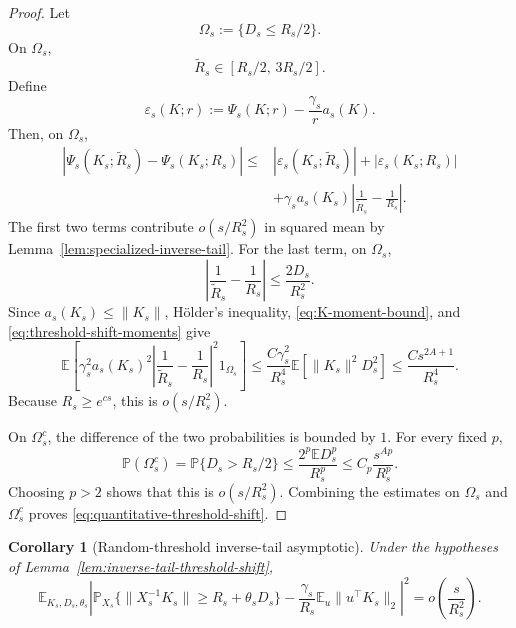 \documentclass[11pt]{article}
\newtheorem{corollary}{Corollary}
\newcommand{\Pbb}{\mathbb P}
\newcommand{\Ebb}{\mathbb E}
\newcommand{\1}{\mathbf 1}
\begin{document}
\begin{proof}
Let
\[
        \Omega_s:=\{D_s\le R_s/2\}.
\]
On \(\Omega_s\),
\[
        \widetilde R_s\in[R_s/2,\,3R_s/2].
\]
Define
\[
        \varepsilon_s(K;r)
        :=
        \Psi_s(K;r)-\frac{\gamma_s}{r}a_s(K).
\]
Then, on \(\Omega_s\),
\begin{align*}
        \left|
        \Psi_s(K_s;\widetilde R_s)
        -
        \Psi_s(K_s;R_s)
        \right|
        \le{}&
        |\varepsilon_s(K_s;\widetilde R_s)|
        +
        |\varepsilon_s(K_s;R_s)|
\\
        &+
        \gamma_s a_s(K_s)
        \left|
        \frac{1}{\widetilde R_s}
        -
        \frac{1}{R_s}
        \right|.
\end{align*}
The first two terms contribute \(o(s/R_s^2)\) in squared mean by
Lemma~\ref{lem:specialized-inverse-tail}.  For the last term, on \(\Omega_s\),
\[
        \left|
        \frac{1}{\widetilde R_s}
        -
        \frac{1}{R_s}
        \right|
        \le
        \frac{2D_s}{R_s^2}.
\]
Since \(a_s(K_s)\le\|K_s\|\), Hölder's inequality,
\eqref{eq:K-moment-bound}, and \eqref{eq:threshold-shift-moments} give
\[
        \Ebb
        \left[
        \gamma_s^2a_s(K_s)^2
        \left|
        \frac{1}{\widetilde R_s}
        -
        \frac{1}{R_s}
        \right|^2
        1_{\Omega_s}
        \right]
        \le
        \frac{C\gamma_s^2}{R_s^4}
        \Ebb\!\left[\|K_s\|^2D_s^2\right]
        \le
        \frac{C s^{2A+1}}{R_s^4}.
\]
Because \(R_s\ge e^{cs}\), this is \(o(s/R_s^2)\).

On \(\Omega_s^c\), the difference of the two probabilities is bounded by \(1\).  For every
fixed \(p\),
\[
        \Pbb(\Omega_s^c)
        =
        \Pbb\{D_s>R_s/2\}
        \le
        \frac{2^p\Ebb D_s^p}{R_s^p}
        \le
        C_p\frac{s^{Ap}}{R_s^p}.
\]
Choosing \(p>2\) shows that this is \(o(s/R_s^2)\).  Combining the estimates on
\(\Omega_s\) and \(\Omega_s^c\) proves
\eqref{eq:quantitative-threshold-shift}.
\end{proof}

\begin{corollary}[Random-threshold inverse-tail asymptotic]
\label{cor:random-threshold-inverse-tail}
Under the hypotheses of Lemma~\ref{lem:inverse-tail-threshold-shift},
\begin{equation}
        \Ebb_{K_s,D_s,\theta_s}
        \left|
        \Pbb_{X_s}
        \{\|X_s^{-1}K_s\|\ge R_s+\theta_sD_s\}
        -
        \frac{\gamma_s}{R_s}
        \Ebb_u\|u^\top K_s\|_2
        \right|^2
        =
        o\left(\frac{s}{R_s^2}\right).
        \label{eq:random-threshold-inverse-tail}
\end{equation}
\end{corollary}
\end{document}
